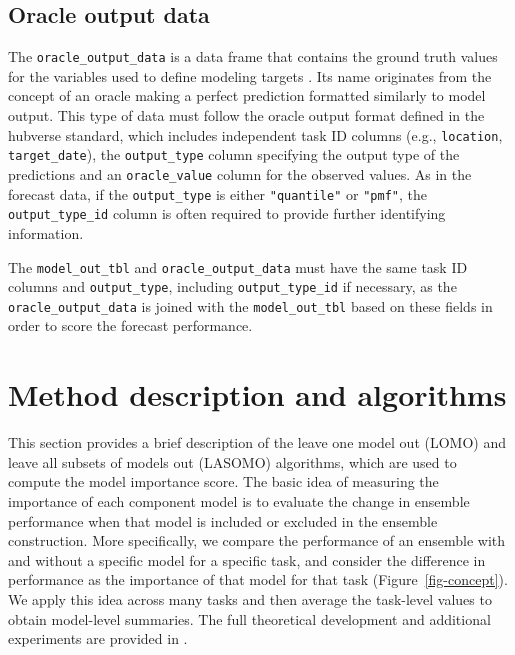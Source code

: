 \documentclass[
  article,
  shortnames,
  notitle]{jss}
\begin{document}
\subsection{Oracle output data}\label{subsec:oracle_output_data}

The \texttt{oracle\_output\_data} is a data frame that contains the
ground truth values for the variables used to define modeling targets
\citep{hubverse_docs, kerr2025coordinating}. Its name originates from
the concept of an oracle making a perfect prediction formatted similarly
to model output. This type of data must follow the oracle output format
defined in the hubverse standard, which includes independent task ID
columns (e.g., \texttt{location}, \texttt{target\_date}), the
\texttt{output\_type} column specifying the output type of the
predictions and an \texttt{oracle\_value} column for the observed
values. As in the forecast data, if the \texttt{output\_type} is either
\texttt{"quantile"} or \texttt{"pmf"}, the \texttt{output\_type\_id}
column is often required to provide further identifying information.

The \texttt{model\_out\_tbl} and \texttt{oracle\_output\_data} must have
the same task ID columns and \texttt{output\_type}, including
\texttt{output\_type\_id} if necessary, as the
\texttt{oracle\_output\_data} is joined with the
\texttt{model\_out\_tbl} based on these fields in order to score the
forecast performance.

\section{Method description and algorithms}\label{sec:algorithms}

This section provides a brief description of the leave one model out
(LOMO) and leave all subsets of models out (LASOMO) algorithms, which
are used to compute the model importance score. The basic idea of
measuring the importance of each component model is to evaluate the
change in ensemble performance when that model is included or excluded
in the ensemble construction. More specifically, we compare the
performance of an ensemble with and without a specific model for a
specific task, and consider the difference in performance as the
importance of that model for that task (Figure~\ref{fig-concept}). We
apply this idea across many tasks and then average the task-level values
to obtain model-level summaries. The full theoretical development and
additional experiments are provided in \citet{kim2026beyond}.
\end{document}
